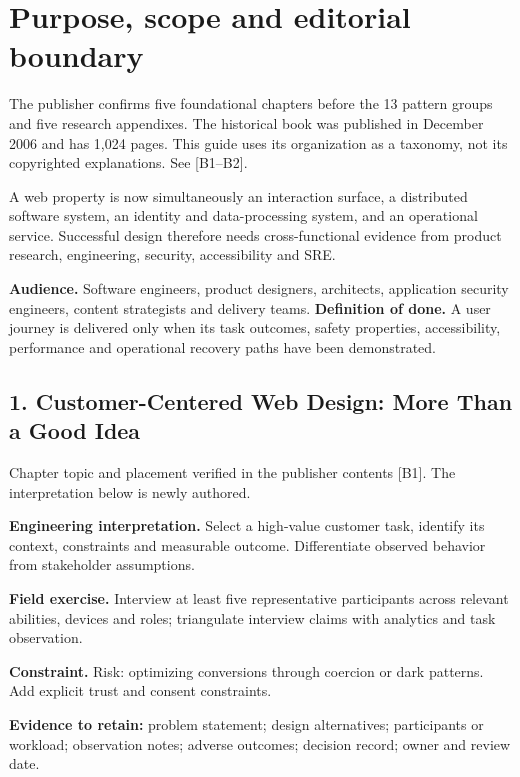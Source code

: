 \documentclass[11pt]{article}
\begin{document}
\MakeFront
\section{Purpose, scope and editorial boundary}

\Provenance
\begin{groundedbox}
The publisher confirms five foundational chapters before the 13 pattern groups and five research appendixes. The historical book was published in December 2006 and has 1,024 pages. This guide uses its organization as a taxonomy, not its copyrighted explanations. See [B1--B2].
\end{groundedbox}
\begin{modernbox}
A web property is now simultaneously an interaction surface, a distributed software system, an identity and data-processing system, and an operational service. Successful design therefore needs cross-functional evidence from product research, engineering, security, accessibility and SRE.
\end{modernbox}
\textbf{Audience.} Software engineers, product designers, architects, application security engineers, content strategists and delivery teams.
\textbf{Definition of done.} A user journey is delivered only when its task outcomes, safety properties, accessibility, performance and operational recovery paths have been demonstrated.

\subsection{1. Customer-Centered Web Design: More Than a Good Idea}
\begin{groundedbox}Chapter topic and placement verified in the publisher contents [B1]. The interpretation below is newly authored.\end{groundedbox}
\textbf{Engineering interpretation.} Select a high-value customer task, identify its context, constraints and measurable outcome. Differentiate observed behavior from stakeholder assumptions.

\textbf{Field exercise.} Interview at least five representative participants across relevant abilities, devices and roles; triangulate interview claims with analytics and task observation.

\textbf{Constraint.} Risk: optimizing conversions through coercion or dark patterns. Add explicit trust and consent constraints.

\textbf{Evidence to retain:} problem statement; design alternatives; participants or workload; observation notes; adverse outcomes; decision record; owner and review date.
\end{document}
